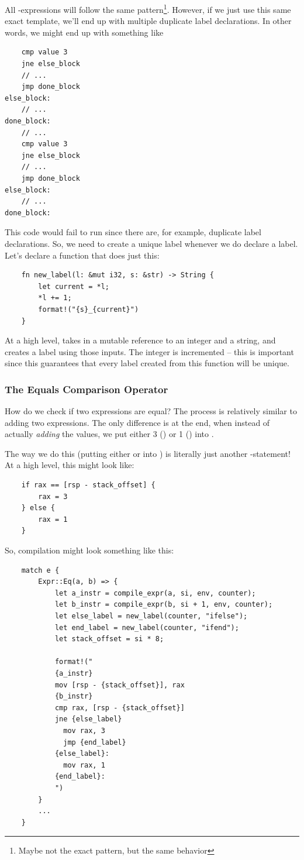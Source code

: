 All -expressions will follow the same pattern\footnote{Maybe not the exact pattern, but the same behavior}. However, if we just use this same exact template, we'll end up with multiple duplicate label declarations. In other words, we might end up with something like 
\begin{verbatim}
    cmp value 3
    jne else_block 
    // ... 
    jmp done_block 
else_block:
    // ... 
done_block:
    // ...
    cmp value 3
    jne else_block 
    // ... 
    jmp done_block 
else_block:
    // ... 
done_block:\end{verbatim}
This code would fail to run since there are, for example, duplicate  label declarations. So, we need to create a unique label whenever we do declare a label. Let's declare a function that does just this: 
\begin{verbatim}
    fn new_label(l: &mut i32, s: &str) -> String {
        let current = *l;
        *l += 1;
        format!("{s}_{current}")
    }\end{verbatim}
At a high level,  takes in a mutable reference to an integer and a string, and creates a label using those inputs. The integer is incremented -- this is important since this guarantees that every label created from this function will be unique.

\subsubsection{The Equals Comparison Operator}
How do we check if two expressions are equal? The process is relatively similar to adding two expressions. The only difference is at the end, when instead of actually \emph{adding} the values, we put either 3 () or 1 () into .

\bigskip 

The way we do this (putting either  or  into ) is literally just another -statement! At a high level, this might look like: 
\begin{verbatim}
    if rax == [rsp - stack_offset] {
        rax = 3
    } else {
        rax = 1
    }\end{verbatim}
So, compilation might look something like this: 
\begin{verbatim}
    match e {
        Expr::Eq(a, b) => {
            let a_instr = compile_expr(a, si, env, counter);
            let b_instr = compile_expr(b, si + 1, env, counter);
            let else_label = new_label(counter, "ifelse");
            let end_label = new_label(counter, "ifend");
            let stack_offset = si * 8;

            format!("
            {a_instr}
            mov [rsp - {stack_offset}], rax
            {b_instr}
            cmp rax, [rsp - {stack_offset}]
            jne {else_label}
              mov rax, 3
              jmp {end_label}
            {else_label}:
              mov rax, 1
            {end_label}:
            ")
        }
        ...
    }\end{verbatim}

